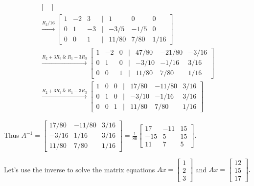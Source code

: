 \begin{example}
\begin{solution}
\begin{gather*}
\begin{bmatrix}
    \end{bmatrix}\\
    \overset{R_3/16}{\longrightarrow} \begin{bmatrix}
        1 & -2 & 3 & \vert & 1 & 0 & 0\\
        0 & 1 & -3 & \vert & -3/5 & -1/5 & 0\\
        0 & 0 & 1 & \vert & 11/80 & 7/80 & 1/16
    \end{bmatrix}\\
    \overset{R_2+3R_3 \ \& \ R_1 - 3R_3}{\longrightarrow} \begin{bmatrix}
        1 & -2 & 0 & \vert & 47/80 & -21/80 & -3/16\\
        0 & 1 & 0 & \vert & -3/10 & -1/16 & 3/16\\
        0 & 0 & 1 & \vert & 11/80 & 7/80 & 1/16
    \end{bmatrix}\\
    \overset{R_2+3R_3 \ \& \ R_1 - 3R_3}{\longrightarrow} \begin{bmatrix}
        1 & 0 & 0 & \vert & 17/80 & -11/80 & 3/16\\
        0 & 1 & 0 & \vert & -3/10 & -1/16 & 3/16\\
        0 & 0 & 1 & \vert & 11/80 & 7/80 & 1/16
    \end{bmatrix}
    \end{gather*}

    Thus \(A^{-1} = \begin{bmatrix}
        17/80 & -11/80 & 3/16 \\
        -3/16 & 1/16 & 3/16 \\
        11/80 & 7/80 & 1/16
    \end{bmatrix} = \frac{1}{80}\begin{bmatrix}
        17 & -11 & 15 \\
        -15 & 5 & 15 \\
        11 & 7 & 5
    \end{bmatrix}.\)

    Let's use the inverse to solve the matrix equations \(Ax = \begin{bmatrix}
        1 \\ 2\\ 3
    \end{bmatrix}\) and \(Ax = \begin{bmatrix}
        12 \\ 15 \\17
    \end{bmatrix}.\)


\end{solution}
\end{example}

